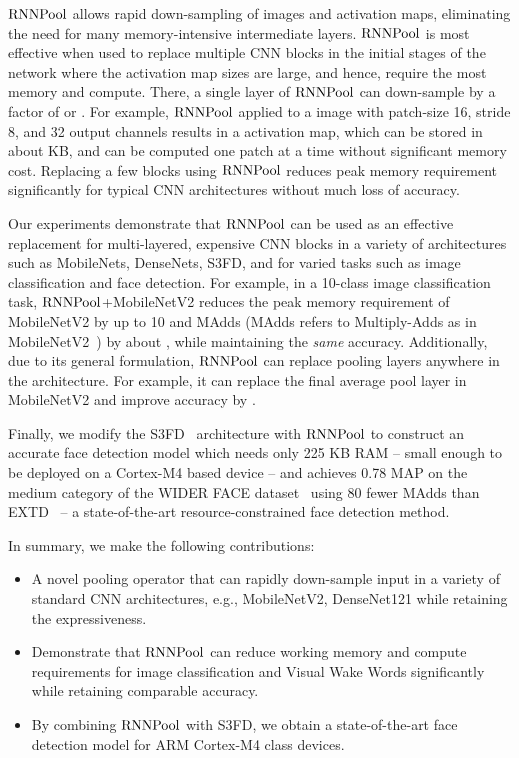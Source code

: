 \documentclass[10pt]{article}
\newcommand{\rpool}{\ensuremath{{\rm RNNPool}}\xspace}
\newcommand{\rpooln}{\ensuremath{{\rm RNNPool}}}
\begin{document}
\rpool allows rapid down-sampling of images and activation maps,
eliminating the need for many memory-intensive intermediate
layers. \rpool is most effective when used to replace multiple CNN
blocks in the initial stages of the network where the activation map
sizes are large, and hence, require the most memory and compute.
There, a single layer of \rpool can down-sample by a factor of  or
. For example, \rpool applied to a  image
with patch-size 16, stride 8, and 32 output channels results in a
 activation map, which can be stored in about
 KB, and can be computed one patch at a time without significant
memory cost.  Replacing a few blocks using \rpool reduces peak memory
requirement significantly for typical CNN architectures without much
loss of accuracy.

Our experiments demonstrate that \rpool can be used as an effective
replacement for multi-layered, expensive CNN blocks in a variety of
architectures such as MobileNets, DenseNets, S3FD, and for varied
tasks such as image classification and face detection.  For example,
in a 10-class image classification task, \rpooln+MobileNetV2 reduces
the peak memory requirement of MobileNetV2 by up to 10 and
MAdds (MAdds refers to Multiply-Adds as in
MobileNetV2~\cite{sandler2018mobilenetv2}) by about , while
  maintaining the {\em same} accuracy. Additionally, due to its
  general formulation, \rpool can replace pooling layers anywhere in
  the architecture. For example, it can replace the final average pool
  layer in MobileNetV2 and improve accuracy by .

Finally, we modify the S3FD~\citep{zhang2017s3fd} architecture with
\rpool to construct an accurate face detection model which needs only
225 KB RAM -- small enough to be deployed on a Cortex-M4 based device
-- and achieves 0.78 MAP on the medium category of the WIDER FACE
dataset~\citep{yang2016wider} using 80 fewer MAdds than
EXTD~\citep{yoo2019extd} -- a state-of-the-art resource-constrained
face detection method.

In summary, we make the following contributions:
\begin{itemize}[leftmargin=*]\vspace{-1mm}
    \itemsep 0pt
    \topsep 0pt
    \parskip 2pt
\item A novel pooling operator that can rapidly down-sample input in a
  variety of standard CNN architectures, e.g., MobileNetV2,
  DenseNet121 while retaining the expressiveness.
\item Demonstrate that \rpool can reduce working memory and compute
  requirements for image classification and Visual Wake Words
  significantly while retaining comparable accuracy.
\item By combining \rpool with S3FD, we obtain a state-of-the-art face
  detection model for ARM Cortex-M4 class devices.
\end{itemize}
\end{document}

